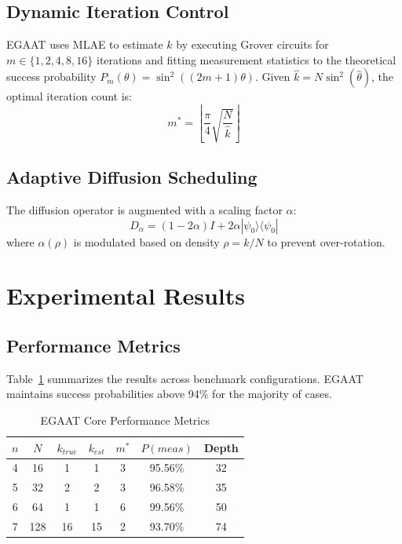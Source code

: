 \documentclass[journal]{IEEEtran}
\begin{document}
\subsection{Dynamic Iteration Control}
EGAAT uses MLAE to estimate $k$ by executing Grover circuits for $m \in \{1, 2, 4, 8, 16\}$ iterations and fitting measurement statistics to the theoretical success probability $P_m(\theta) = \sin^2((2m+1)\theta)$. Given $\hat{k} = N\sin^2(\hat{\theta})$, the optimal iteration count is:
\begin{equation}
  m^* = \left\lfloor \frac{\pi}{4} \sqrt{\frac{N}{\hat{k}}} \right\rfloor
\end{equation}

\subsection{Adaptive Diffusion Scheduling}
The diffusion operator is augmented with a scaling factor $\alpha$:
\begin{equation}
  D_\alpha = (1 - 2\alpha)I + 2\alpha|\psi_0\rangle\langle\psi_0|
\end{equation}
where $\alpha(\rho)$ is modulated based on density $\rho = k/N$ to prevent over-rotation.

\section{Experimental Results}
\subsection{Performance Metrics}
Table~\ref{tab:performance} summarizes the results across benchmark configurations. EGAAT maintains success probabilities above 94\% for the majority of cases.

\begin{table}[h]
\centering
\caption{EGAAT Core Performance Metrics}
\label{tab:performance}
\begin{tabular}{@{}ccccccc@{}}
\toprule
$n$ & $N$ & $k_{true}$ & $k_{est}$ & $m^*$ & $P(meas)$ & Depth \\ \midrule
4   & 16  & 1          & 1         & 3     & 95.56\%   & 32    \\
5   & 32  & 2          & 2         & 3     & 96.58\%   & 35    \\
6   & 64  & 1          & 1         & 6     & 99.56\%   & 50    \\
7   & 128 & 16         & 15        & 2     & 93.70\%   & 74    \\ \bottomrule
\end{tabular}
\end{table}
\end{document}
